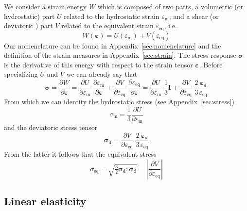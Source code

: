 \documentclass[times,namecite]{goose-article}
\begin{document}
We consider a strain energy $W$ which is composed of two parts, a volumetric (or hydrostatic) part $U$ related to the hydrostatic strain $\varepsilon_\mathrm{m}$, and a shear (or deviatoric ) part $V$ related to the equivalent strain $\varepsilon_\mathrm{eq}$, i.e.\
\begin{equation}
  W ( \bm{\varepsilon} ) = U ( \varepsilon_\mathrm{m} ) + V ( \varepsilon_\mathrm{eq} )
\end{equation}
Our nomenclature can be found in Appendix~\ref{sec:nomenclature} and the definition of the strain measures in Appendix~\ref{sec:strain}. The stress response $\bm{\sigma}$ is the derivative of this energy with respect to the strain tensor $\bm{\varepsilon}$. Before specializing $U$ and $V$ we can already say that
\begin{equation}
  \bm{\sigma}
  =
  \frac{\partial W}{\partial \bm{\varepsilon}}
  =
  \frac{\partial U}{\partial \varepsilon_\mathrm{m}} \;
  \frac{\partial \varepsilon_\mathrm{m}}{\partial \bm{\varepsilon}}
  +
  \frac{\partial V}{\partial \varepsilon_\mathrm{eq}} \;
  \frac{\partial \varepsilon_\mathrm{eq}}{\partial \bm{\varepsilon}}
  =
  \frac{\partial U}{\partial \varepsilon_\mathrm{m}} \;
  \frac{1}{3} \bm{I}
  +
  \frac{\partial V}{\partial \varepsilon_\mathrm{eq}} \;
  \frac{2}{3}
  \frac{\bm{\varepsilon}_d}{\varepsilon_\mathrm{eq}}
\end{equation}
From which we can identity the hydrostatic stress (see Appendix~\ref{sec:stress})
\begin{equation}
  \sigma_\mathrm{m} = \frac{1}{3} \frac{\partial U}{\partial \varepsilon_\mathrm{m}}
\end{equation}
and the deviatoric stress tensor
\begin{equation}
  \bm{\sigma}_\mathrm{d}
  =
  \frac{\partial V}{\partial \varepsilon_\mathrm{eq}} \;
  \frac{2}{3}
  \frac{\bm{\varepsilon}_d}{\varepsilon_\mathrm{eq}}
\end{equation}
From the latter it follows that the equivalent stress
\begin{equation}\label{eq:sig_eq}
  \sigma_\mathrm{eq}
  =
  \sqrt{ \tfrac{3}{2} \bm{\sigma}_\mathrm{d} : \bm{\sigma}_\mathrm{d} }
  =
  \left| \frac{\partial V}{\partial \varepsilon_\mathrm{eq}} \right|
\end{equation}

\subsection{Linear elasticity}
\end{document}
